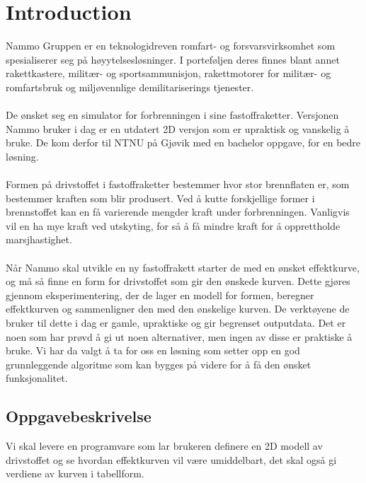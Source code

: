 \chapter{Introduction}

\label{chap:introduksjon}

\graphicspath{ {images/} }


Nammo Gruppen er en teknologidreven romfart- og forsvarsvirksomhet som spesialiserer seg på høyytelsesløsninger. I porteføljen deres finnes blant annet rakettkastere, militær- og sportsammunisjon, rakettmotorer for militær- og romfartsbruk og miljøvennlige demilitariserings tjenester.\cite{Nammo}\\
\\De ønsket seg en simulator for forbrenningen i sine fastoffraketter. Versjonen Nammo bruker i dag er en utdatert 2D versjon som er upraktisk og vanskelig å bruke. De kom derfor til NTNU på Gjøvik med en bachelor oppgave, for en bedre løsning.\\
\\Formen på drivstoffet i fastoffraketter bestemmer hvor stor brennflaten er, som bestemmer kraften som blir produsert. Ved å kutte forskjellige former i brennstoffet kan en få varierende mengder kraft under forbrenningen. Vanligvis vil en ha mye kraft ved utskyting, for så å få mindre kraft for å opprettholde marsjhastighet.\\
\\Når Nammo skal utvikle en ny fastoffrakett starter de med en ønsket effektkurve, og må så finne en form for drivstoffet som gir den ønskede kurven. Dette gjøres gjennom eksperimentering, der de lager en modell for formen, beregner effektkurven og sammenligner den med den ønskelige kurven. De verktøyene de bruker til dette i dag er gamle, upraktiske og gir begrenset outputdata. Det er noen som har prøvd å gi ut noen alternativer, men ingen av disse er praktiske å bruke. Vi har da valgt å ta for oss en løsning som setter opp en god grunnleggende algoritme som kan bygges på videre for å få den ønsket funksjonalitet.\\


\section{Oppgavebeskrivelse}


Vi skal levere en programvare som lar brukeren definere en 2D modell av drivstoffet og se hvordan effektkurven vil være umiddelbart, det skal også gi verdiene av kurven i tabellform.

